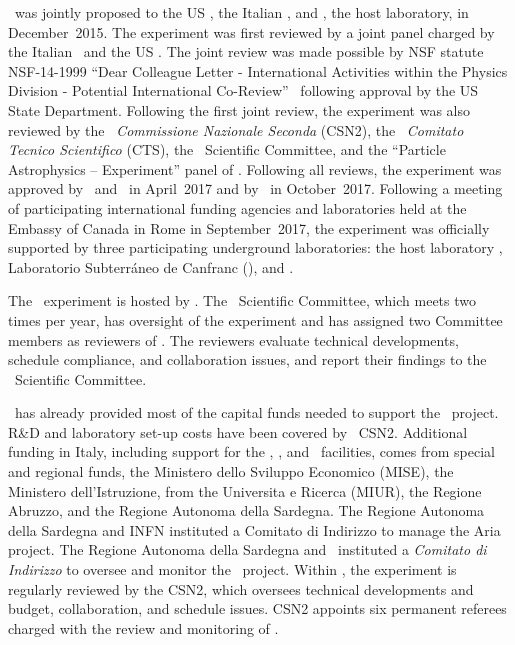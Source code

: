 \DSks\ was jointly proposed to the US \NSF, the Italian \INFN, and \LNGS, the host laboratory, in December~2015.  The experiment was first reviewed by a joint panel charged by the Italian \INFN\ and the US \NSF.  The joint review was made possible by NSF statute NSF-14-1999 ``Dear Colleague Letter - International Activities within the Physics Division - Potential International Co-Review''~\cite{USNationalScienceFoundation:2014vy} following approval by the US State Department.  Following the first joint review, the experiment was also reviewed by the \INFN\ {\it Commissione Nazionale Seconda} (CSN2), the \INFN\ {\it Comitato Tecnico Scientifico} (CTS),  the \LNGS\ Scientific Committee, and the ``Particle Astrophysics -- Experiment'' panel of \NSF.  Following all reviews, the experiment was approved by \INFN\ and \LNGS\ in April~2017 and by \NSF\ in October~2017.  Following a meeting of participating international funding agencies and laboratories held at the Embassy of Canada in Rome in September~2017, the experiment was officially supported by three participating underground laboratories: the host laboratory \LNGS, Laboratorio Subterr\'aneo de Canfranc (\LSC), and \SNOLAB.

The \DSks\ experiment is hosted by \LNGS.  The \LNGS\ Scientific Committee, which meets two times per year, has oversight of the experiment and has assigned two Committee members as reviewers of \DSks.  The reviewers evaluate technical developments, schedule compliance, and collaboration issues, and report their findings to the \LNGS\ Scientific Committee.

\INFN\ has already provided most of the capital funds needed to support the \DSks\ project. R\&D and laboratory set-up costs have been covered by \INFN\ CSN2.  Additional funding in Italy, including support for the \Urania, \Aria, and \NOA\ facilities, comes from special and regional funds, the Ministero dello Sviluppo Economico (MISE), the Ministero dell'Istruzione, from the Universita e Ricerca (MIUR), the Regione Abruzzo, and the Regione Autonoma della Sardegna.  The Regione Autonoma della Sardegna and INFN instituted a Comitato di Indirizzo to manage the Aria project.  The Regione Autonoma della Sardegna and \INFN\ instituted a {\it Comitato di Indirizzo} to oversee and monitor the \Aria\ project.  Within \INFN, the experiment is regularly reviewed by the CSN2, which oversees technical developments and budget, collaboration, and schedule issues.  CSN2 appoints six permanent referees charged with the review and monitoring of \DSks.

